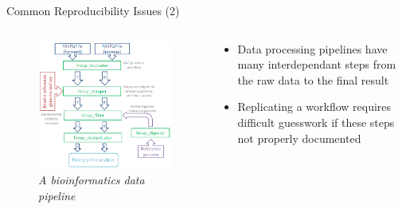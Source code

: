 \documentclass[10pt]{beamer}
\begin{document}
\begin{frame}{Common Reproducibility Issues (2)}
    \begin{columns}
        \begin{column}{0.5\textwidth}  %
            \begin{center}
                \begin{figure}
                    \includegraphics[width=1.1\textwidth]{images/pipeline.png}
                    \caption*{{\sl A bioinformatics data pipeline}}
                \end{figure}
            \end{center}
        \end{column}
        \begin{column}{0.5\textwidth}
            \begin{itemize}
                \item Data processing pipelines have many interdependant steps
                from the raw data to the final result 
                \item Replicating a workflow requires difficult guesswork if these steps not properly documented 
            \end{itemize}
        \end{column}
    \end{columns}
\end{frame}
\end{document}
